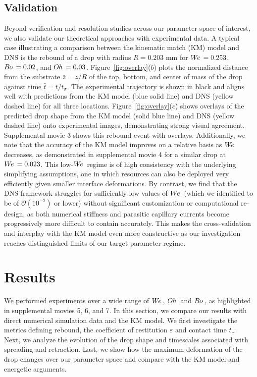 \documentclass{jfm}
\newcommand{\We}{W\kern-0.15em e\,}
\newcommand{\Bo}{B\kern-0.05em o\,}
\newcommand{\Oh}{O\kern-0.05em h\,}
\begin{document}
\subsection{Validation} \label{subsec:validation}

Beyond verification and resolution studies across our parameter space of interest, we also validate our theoretical approaches with experimental data. A typical case illustrating a comparison between the kinematic match (KM) model and DNS is the rebound of a drop with radius $R=0.203$ mm for $\We=0.253$, $\Bo=0.02$, and $\Oh=0.03$. Figure~\ref{fig:overlay}($b$) plots the normalized distance from the substrate $\bar{z}=z/R$ of the top, bottom, and center of mass of the drop against time $\bar{t}=t/t_{\sigma}$. The experimental trajectory is shown in black and aligns well with predictions from the KM model (blue solid line) and DNS (yellow dashed line) for all three locations. Figure~\ref{fig:overlay}($c$) shows overlays of the predicted drop shape from the KM model (solid blue line) and DNS (yellow dashed line) onto experimental images, demonstrating strong visual agreement. Supplemental movie 3 shows this rebound event with overlays. Additionally, we note that the accuracy of the KM model improves on a relative basis as $\We$ decreases, as demonstrated in supplemental movie 4 for a similar drop at $\We=0.023$. This low-$\We$ regime is of high consistency with the underlying simplifying assumptions, one in which resources can also be deployed very efficiently given smaller interface deformations. By contrast, we find that the DNS framework struggles for sufficiently low values of $\We$ (which we identified to be of $\mathcal{O}(10^{-2})$ or lower) without significant customization or computational re-design, as both numerical stiffness and parasitic capillary currents become progressively more difficult to contain accurately. This makes the cross-validation and interplay with the KM model even more constructive as our investigation reaches distinguished limits of our target parameter regime.

\section{Results}\label{sec:results} \label{sec:results}

We performed experiments over a wide range of $\We$, $\Oh$ and $\Bo$, as highlighted in supplemental movies 5, 6, and 7. In this section, we compare our results with direct numerical simulation data and the KM model. We first investigate the metrics defining rebound, the coefficient of restitution $\varepsilon$ and contact time $t_c$. Next, we analyze the evolution of the drop shape and timescales associated with spreading and retraction. Last, we show how the maximum deformation of the drop changes over our parameter space and compare with the KM model and energetic arguments.
\end{document}
